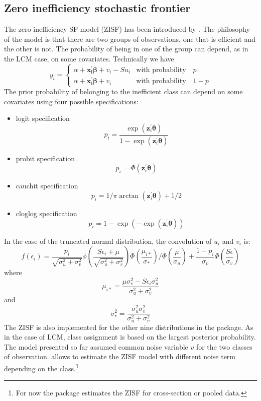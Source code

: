 \documentclass[nojss]{jss}
\begin{document}
\subsection{Zero inefficiency stochastic frontier}

The zero inefficiency SF model (ZISF) has been introduced by \citet{kpt13}. The 
philosophy of the model is that there are two groups of observations, one that is
efficient and the other is not. The probability of being in one of the group can 
depend, as in the LCM case, on some covariates. Technically we have
%
\begin{equation}\label{eq:2.2.1}
y_i = \begin{cases}
\alpha + \mathbf{x_i^{\prime}}\bm{\beta} + 
 v_i - Su_i & \text{with probability} \quad p \\
 \alpha + \mathbf{x_i^{\prime}}\bm{\beta} +
  v_i & \text{with probability} \quad 1-p
\end{cases}
\end{equation}
%
The prior probability of belonging to the inefficient class can depend on 
some covariates using four possible specifications: 

\begin{itemize} \itemsep 10pt
\item logit specification
%
$$p_i = \frac{\exp{(\mathbf{z}_{i}^{\prime}\bm{\theta})}}{1-
\exp{(\mathbf{z}_{i}^{\prime}\bm{\theta})}}$$
%
\item probit specification
%
$$p_i = \Phi\left(\mathbf{z}_{i}^{\prime}\bm{\theta}\right)$$
%
\item cauchit specification
%
$$p_i = 1/\pi\arctan(\mathbf{z}_{i}^{\prime}\bm{\theta})+1/2$$
%
\item cloglog specification
%
$$p_i = 1-\exp\left(-\exp(\mathbf{z}_{i}^{\prime} \bm{\theta})\right)$$
%
\end{itemize}

In the case of the truncated normal distribution, the convolution of $u_i$ and 
$v_i$ is:
%
 $$f(\epsilon_i)=\frac{p_i}{\sqrt{\sigma_u^2 + 
 \sigma_v^2}}\phi\left(\frac{S\epsilon_i + \mu}{\sqrt{
 \sigma_u^2 + \sigma_v^2}}\right)\Phi\left(\frac{
 \mu_{i\ast}}{\sigma_\ast}\right)\Big/\Phi\left(
 \frac{\mu}{\sigma_u}\right) + \frac{1-p_i}{\sigma_v}
 \Phi\left(\frac{S\epsilon}{\sigma_v}\right)$$
%
 where
%
 $$\mu_{i*}=\frac{\mu\sigma_v^2 - 
 S\epsilon_i\sigma_u^2}{\sigma_u^2 + \sigma_v^2}$$
%
 and
%
 $$\sigma_*^2 = \frac{\sigma_u^2 
 \sigma_v^2}{\sigma_u^2 + \sigma_v^2}$$
 The ZISF is also implemented for the other nine distributions in the package.
 As in the case of LCM, class assignment is based on the largest posterior 
 probability. The model presented so far assumed common noise variable $v$ for 
 the two classes of observation.  allows to estimate the ZISF model
 with different noise term depending on the class.\footnote{For now the
  package estimates the ZISF for cross-section or pooled data.}
\end{document}
